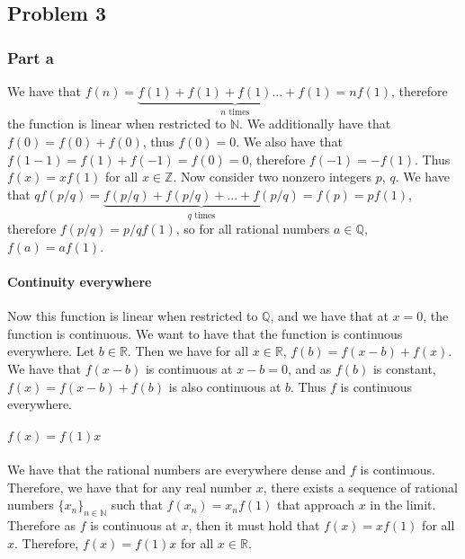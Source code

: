 \documentclass{article}
\theoremstyle{definition}
\numberwithin{theorem}{section}
\numberwithin{equation}{section}
\begin{document}
\subsection{Problem 3}
\subsubsection{Part a}
We have that $f(n) = \underbrace{f(1) + f(1) + f(1) ... + f(1)}_{n \text{ times}} = n f(1) $, therefore the function is linear when restricted to $\mathbb{N}$. We additionally have that $f(0) = f(0) + f(0)$, thus $f(0) = 0$. We also have that $f(1 - 1) = f(1) + f(-1) = f(0) = 0$, therefore $f(-1) = - f(1)$. Thus $f(x) = x f(1)$ for all $x \in \mathbb{Z}$. Now consider two nonzero integers $p$, $q$. We have that $q f(p/q) = \underbrace{f(p/q) + f(p/q) + ... + f(p/q)}_{q \text{ times}} = f(p) = p f(1)$, therefore $f(p/q) = p/q f(1)$, so for all rational numbers $a \in \mathbb{Q}$, $f(a) = a f(1)$. 
\paragraph{Continuity everywhere}
Now this function is linear when restricted to $\mathbb{Q}$, and we have that at $x = 0$, the function is continuous. We want to have that the function is continuous everywhere. Let $b \in \mathbb{R}$. Then we have for all $x \in \mathbb{R}$, $f(b) = f(x - b) + f(x)$. We have that $f(x - b)$ is continuous at $x - b = 0$, and as $f(b)$ is constant, $f(x) = f(x - b) + f(b)$ is also continuous at $b$. Thus $f$ is continuous everywhere.
\paragraph{$f(x) = f(1) x$}
We have that the rational numbers are everywhere dense and $f$ is continuous. Therefore, we have that for any real number $x$, there exists a sequence of rational numbers $\lbrace x_n \rbrace_{n \in \mathbb{N}}$ such that $f(x_n) = x_n f(1)$ that approach $x$ in the limit. Therefore as $f$ is continuous at $x$, then it must hold that $f(x) = x f(1)$ for all $x$. Therefore, $f(x) = f(1) x$ for all $x \in \mathbb{R}$. 
\end{document}
